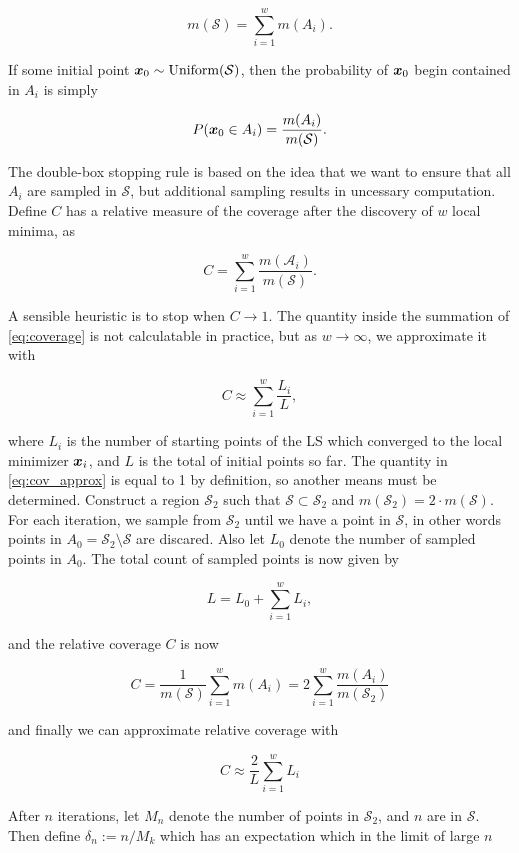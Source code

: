 $$
m(\mathcal{S}) = \sum_{i=1}^w m(A_i).
$$

If some initial point $\boldsymbol{x}_0 \sim \text{Uniform}(\mathcal{S})$, then the probability of $\boldsymbol{x}_0$ begin contained
in $A_i$ is simply

$$
P(\boldsymbol{x}_0 \in A_i) = \frac{m(A_i)}{m(\mathcal{S})}.
$$

The double-box stopping rule is based on the idea that we want to ensure that all $A_i$ are sampled in $\mathcal{S}$, but
additional sampling results in uncessary computation. Define $C$ has a relative measure of the coverage after the discovery
of $w$ local minima, as

\begin{equation}\label{eq:coverage}
C = \sum_{i=1}^w \frac{m(\mathcal{A}_i)}{m(\mathcal{S})}.
\end{equation}

A sensible heuristic is to stop when $C\longrightarrow 1$. The quantity inside the summation of \cref{eq:coverage} is
not calculatable in practice, but as $w\rightarrow \infty$, we approximate it with

\begin{equation}\label{eq:cov_approx}
C \approx \sum_{i=1}^w \frac{L_i}{L},
\end{equation}

where $L_i$ is the number of starting points of the LS which converged to the local minimizer $\boldsymbol{x}_i$, and
$L$ is the total of initial points so far. The quantity in \cref{eq:cov_approx} is equal to 1 by definition, so another
means must be determined. Construct a region $\mathcal{S}_2$ such that $\mathcal{S}\subset \mathcal{S}_2$ and 
$m(\mathcal{S}_2) = 2\cdot m(\mathcal{S})$. For each iteration, we sample from $\mathcal{S}_2$ until we have a point in
$\mathcal{S}$, in other words points in $A_0 = \mathcal{S}_2 \setminus \mathcal{S}$ are discared. Also let
$L_0$ denote the number of sampled points in $A_0$. The total count of sampled points is now given by

$$
L = L_0 + \sum_{i=1}^w L_i,
$$

and the relative coverage $C$ is now

$$
C = \frac{1}{m(\mathcal{S})} \sum_{i=1}^w m(A_i) = 2\sum_{i=1}^w \frac{m(A_i)}{m(\mathcal{S}_2)}
$$

and finally we can approximate relative coverage with

$$
C \approx \frac{2}{L}\sum_{i=1}^w L_i
$$

After $n$ iterations, let $M_n$ denote the number of points in $\mathcal{S}_2$, and $n$ are in $\mathcal{S}$. Then define
$\delta_n := n / M_k$ which has an expectation which in the limit of large $n$

